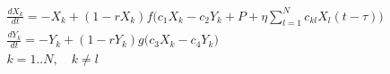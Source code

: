 \documentclass[10pt,a4paper]{report}
\begin{document}
\begin{equation*}
     \begin{aligned}
     & \frac{dX_k}{dt} = -X_k+(1-rX_k)f\Big(c_1X_k-c_2Y_k + P +\eta \sum_{l=1}^N c_{kl}X_l(t-\tau) \Big) \\
     & \frac{dY_k}{dt} = -Y_k+(1-rY_k)g\Big(c_3X_k-c_4Y_k   \Big)     \\
     & k = 1..N, \quad  k \neq l
     \end{aligned}
\end{equation*}
\end{document}
